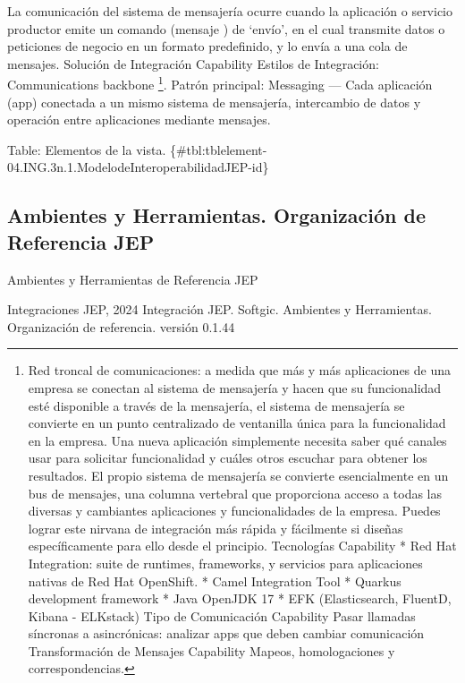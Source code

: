 \documentclass[
  paper=a4,
  ,captions=tableheading
]{scrartcl}
\renewenvironment{quote}{\begin{customblockquote}\list{}{\rightmargin=0em\leftmargin=0em}%
\item\relax\color{blockquote-text}\ignorespaces}{\unskip\unskip\endlist\end{customblockquote}}
\begin{document}
La comunicación del sistema de mensajería ocurre cuando la aplicación o
servicio productor emite un comando (mensaje ) de `envío', en el cual
transmite datos o peticiones de negocio en un formato predefinido, y lo
envía a una cola de mensajes. \textbar{} \textbar{} Solución de
Integración \textbar{} Capability \textbar{} Estilos de Integración:
Communications backbone \footnote{Red troncal de comunicaciones: a
  medida que más y más aplicaciones de una empresa se conectan al
  sistema de mensajería y hacen que su funcionalidad esté disponible a
  través de la mensajería, el sistema de mensajería se convierte en un
  punto centralizado de ventanilla única para la funcionalidad en la
  empresa. Una nueva aplicación simplemente necesita saber qué canales
  usar para solicitar funcionalidad y cuáles otros escuchar para obtener
  los resultados. El propio sistema de mensajería se convierte
  esencialmente en un bus de mensajes, una columna vertebral que
  proporciona acceso a todas las diversas y cambiantes aplicaciones y
  funcionalidades de la empresa. Puedes lograr este nirvana de
  integración más rápida y fácilmente si diseñas específicamente para
  ello desde el principio. \textbar{} \textbar{} Tecnologías \textbar{}
  Capability \textbar{} * Red Hat Integration: suite de runtimes,
  frameworks, y servicios para aplicaciones nativas de Red Hat
  OpenShift. * Camel Integration Tool * Quarkus development framework *
  Java OpenJDK 17 * EFK (Elasticsearch, FluentD, Kibana - ELKstack)
  \textbar{} \textbar{} Tipo de Comunicación \textbar{} Capability
  \textbar{} Pasar llamadas síncronas a asincrónicas: analizar apps que
  deben cambiar comunicación \textbar{} \textbar{} Transformación de
  Mensajes \textbar{} Capability \textbar{} Mapeos, homologaciones y
  correspondencias. \textbar{}}. Patrón principal: Messaging --- Cada
aplicación (app) conectada a un mismo sistema de mensajería, intercambio
de datos y operación entre aplicaciones mediante mensajes.

Table: Elementos de la vista.
\{\#tbl:tblelement-04.ING.3n.1.ModelodeInteroperabilidadJEP-id\}

\subsection{Ambientes y Herramientas. Organización de Referencia
JEP}\label{sec:ambientes-y-herramientas.-organizaciuxf3n-de-referencia-jep}

Ambientes y Herramientas de Referencia JEP

\begin{quote}
Integraciones JEP, 2024 Integración JEP. Softgic. Ambientes y
Herramientas. Organización de referencia. versión 0.1.44
\end{quote}
\end{document}
